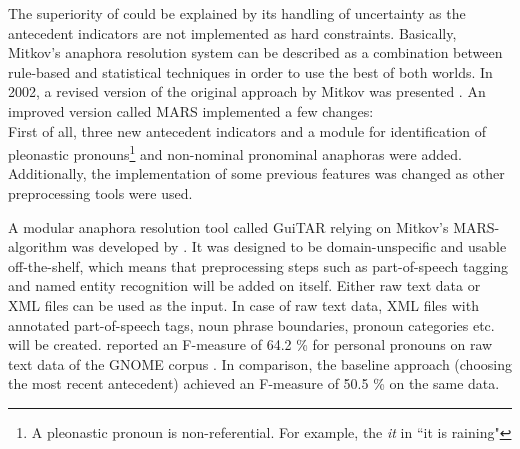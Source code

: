 The superiority of \citep{mitkov1998robust} could be explained by its handling of uncertainty as the antecedent indicators are not implemented as hard constraints. Basically, Mitkov's anaphora resolution system can be described as a combination between rule-based and statistical techniques in order to use the best of both worlds.
In 2002, a revised version of the original approach by Mitkov was presented \citep{mitkov2002new}. An improved version called MARS implemented a few changes:\\
First of all, three new antecedent indicators and a module for identification of pleonastic pronouns\footnote{A pleonastic pronoun is non-referential. For example, the \textit{it} in ``it is raining" } and non-nominal pronominal anaphoras were added. Additionally, the implementation of some previous features was changed as other preprocessing tools were used.

A modular anaphora resolution tool called GuiTAR relying on Mitkov's MARS-algorithm \citep{mitkov2002new} was developed by \cite{poesio2004general}. It was designed to be domain-unspecific and usable off-the-shelf, which means that preprocessing steps such as part-of-speech tagging and named entity recognition will be added on itself. Either raw text data or XML files can be used as the input. In case of raw text data, XML files with annotated part-of-speech tags, noun phrase boundaries, pronoun categories etc. will be created. \citep{poesio2004mate} reported an F-measure of 64.2 \% for personal pronouns on raw text data of the GNOME corpus \citep{poesio2004general}. In comparison, the baseline approach (choosing the most recent antecedent) achieved an F-measure of 50.5 \% on the same data.

